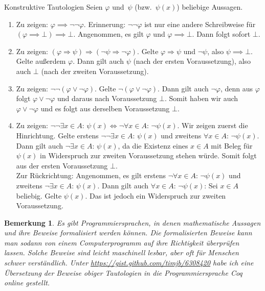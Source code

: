 \documentclass{pizzablatt}
\newtheorem*{bem}{Bemerkung}
\begin{document}
\begin{aufgabe}{Konstruktive Tautologien}
Seien $\varphi$ und~$\psi$ (bzw.~$\psi(x)$) beliebige Aussagen.
\begin{enumerate}
\item Zu zeigen: $\varphi \implies \neg\neg\varphi$. Erinnerung: $\neg\neg\varphi$ ist nur eine andere Schreibweise für $(\varphi \implies \bot) \implies \bot$. Angenommen, es gilt $\varphi$ und $\varphi \implies \bot$. Dann folgt sofort $\bot$.
\item Zu zeigen: $(\varphi \Rightarrow \psi) \Longrightarrow (\neg\psi \Rightarrow
\neg\varphi)$. Gelte $\varphi \Rightarrow \psi$ und $\neg\psi$, also $\psi \implies \bot$. Gelte außerdem $\varphi$. Dann gilt auch $\psi$ (nach der ersten Voraussetzung), also auch $\bot$ (nach der zweiten Voraussetzung).
\item Zu zeigen: $\neg\neg(\varphi \vee \neg\varphi)$. Gelte $\neg(\varphi \vee \neg\varphi)$. Dann gilt auch $\neg\varphi$, denn aus $\varphi$ folgt $\varphi \vee \neg\varphi$ und daraus nach Voraussetzung $\bot$. Somit haben wir auch $\varphi \vee \neg\varphi$ und es folgt aus derselben Voraussetzung $\bot$.
\item Zu zeigen: $\neg\neg\exists x \in A{:}\, \psi(x) \Longleftrightarrow
  \neg\forall x \in A{:}\, \neg\psi(x)$. Wir zeigen zuerst die Hinrichtung. Gelte erstens $\neg\neg\exists x \in A{:}\, \psi(x)$ und zweitens $\forall x \in A{:}\, \neg\psi(x)$. Dann gilt auch $\neg\exists x \in A{:}\, \psi(x)$, da die Existenz eines $x \in A$ mit Beleg für $\psi(x)$ in Widerspruch zur zweiten Voraussetzung stehen würde. Somit folgt aus der ersten Voraussetzung $\bot$.\\
  Zur Rückrichtung: Angenommen, es gilt erstens $\neg\forall x \in A{:}\, \neg\psi(x)$ und zweitens $\neg\exists x \in A{:}\, \psi(x)$. Dann gilt auch $\forall x \in A{:}\, \neg\psi(x)$: Sei $x \in A$ beliebig. Gelte $\psi(x)$. Das ist jedoch ein Widerspruch zur zweiten Voraussetzung.
\end{enumerate}

\begin{bem}
  Es gibt Programmiersprachen, in denen mathematische Aussagen und ihre Beweise formalisiert werden können. Die formalisierten Beweise kann man sodann von einem Computerprogramm auf ihre Richtigkeit überprüfen lassen. Solche Beweise sind leicht maschinell lesbar, aber oft für Menschen schwer verständlich. Unter \url{https://gist.github.com/timjb/6308420} habe ich eine Übersetzung der Beweise obiger Tautologien in die Programmiersprache \emph{Coq} online gestellt.
\end{bem}
\end{aufgabe}
\end{document}
